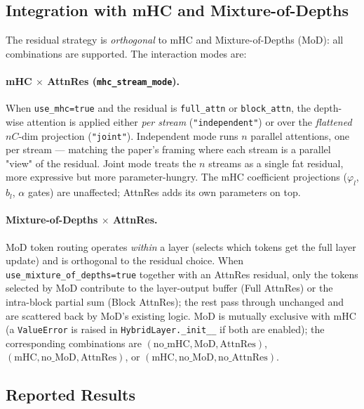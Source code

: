 \subsection{Integration with mHC and Mixture-of-Depths}

The residual strategy is \emph{orthogonal} to mHC and Mixture-of-Depths
(MoD): all combinations are supported. The interaction modes are:

\paragraph{mHC $\times$ AttnRes (\texttt{mhc\_stream\_mode}).}
When \texttt{use\_mhc=true} and the residual is \texttt{full\_attn} or
\texttt{block\_attn}, the depth-wise attention is applied either
\emph{per stream} (\texttt{"independent"}) or over the
\emph{flattened} $nC$-dim projection (\texttt{"joint"}). Independent
mode runs $n$ parallel attentions, one per stream --- matching the
paper's framing where each stream is a parallel "view" of the residual.
Joint mode treats the $n$ streams as a single fat residual, more
expressive but more parameter-hungry. The mHC coefficient projections
($\varphi_l$, $b_l$, $\alpha$ gates) are unaffected; AttnRes adds its
own parameters on top.

\paragraph{Mixture-of-Depths $\times$ AttnRes.}
MoD token routing operates \emph{within} a layer (selects which tokens
get the full layer update) and is orthogonal to the residual choice.
When \texttt{use\_mixture\_of\_depths=true} together with an AttnRes
residual, only the tokens selected by MoD contribute to the layer-output
buffer (Full AttnRes) or the intra-block partial sum (Block AttnRes);
the rest pass through unchanged and are scattered back by MoD's
existing logic. MoD is mutually exclusive with mHC (a
\texttt{ValueError} is raised in \texttt{HybridLayer.\-\_\-init\_\_} if
both are enabled); the corresponding combinations are
$(\text{no\_mHC}, \text{MoD}, \text{AttnRes})$,
$(\text{mHC}, \text{no\_MoD}, \text{AttnRes})$, or
$(\text{mHC}, \text{no\_MoD}, \text{no\_AttnRes})$.

\subsection{Reported Results}

